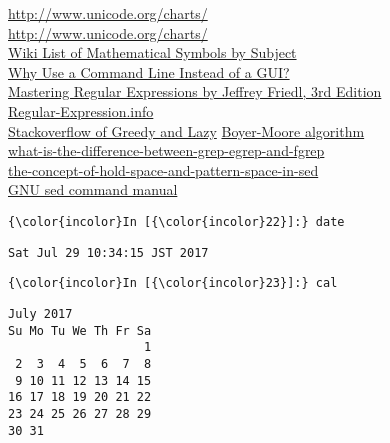 \documentclass[11pt]{article}
\begin{document}
\href{https://en.wikipedia.org/wiki/ANSI_escape_code}{http://www.unicode.org/charts/}\\
\url{http://www.unicode.org/charts/}\\
\href{https://en.wikipedia.org/wiki/List_of_mathematical_symbols_by_subject\#Probability_theory}{Wiki
List of Mathematical Symbols by Subject}\\
\href{http://www.jpeek.com/talks/osu_20010508/}{Why Use a Command Line
Instead of a GUI?}\\
\href{http://shop.oreilly.com/product/9780596528126.do}{Mastering
Regular Expressions by Jeffrey Friedl, 3rd Edition}\\
\href{http://www.regular-expressions.info/tutorial.html}{Regular-Expression.info}\\
\href{https://stackoverflow.com/questions/2301285/what-do-lazy-and-greedy-mean-in-the-context-of-regular-expressions}{Stackoverflow
of Greedy and Lazy}
\href{https://en.wikipedia.org/wiki/Boyer\%E2\%80\%93Moore_string_search_algorithm}{Boyer-Moore
algorithm}\\
\href{https://unix.stackexchange.com/questions/17949/what-is-the-difference-between-grep-egrep-and-fgrep}{what-is-the-difference-between-grep-egrep-and-fgrep}\\
\href{https://stackoverflow.com/questions/12833714/the-concept-of-hold-space-and-pattern-space-in-sed}{the-concept-of-hold-space-and-pattern-space-in-sed}\\
\href{https://www.gnu.org/software/sed/manual/sed.html}{GNU sed command
manual}

    \begin{Verbatim}[commandchars=\\\{\}]
{\color{incolor}In [{\color{incolor}22}]:} date
\end{Verbatim}

    \begin{Verbatim}[commandchars=\\\{\}]
Sat Jul 29 10:34:15 JST 2017

    \end{Verbatim}

    \begin{Verbatim}[commandchars=\\\{\}]
{\color{incolor}In [{\color{incolor}23}]:} cal
\end{Verbatim}

    \begin{Verbatim}[commandchars=\\\{\}]
     July 2017        
Su Mo Tu We Th Fr Sa  
                   1  
 2  3  4  5  6  7  8  
 9 10 11 12 13 14 15  
16 17 18 19 20 21 22  
23 24 25 26 27 28 29  
30 31                 

    \end{Verbatim}
\end{document}
